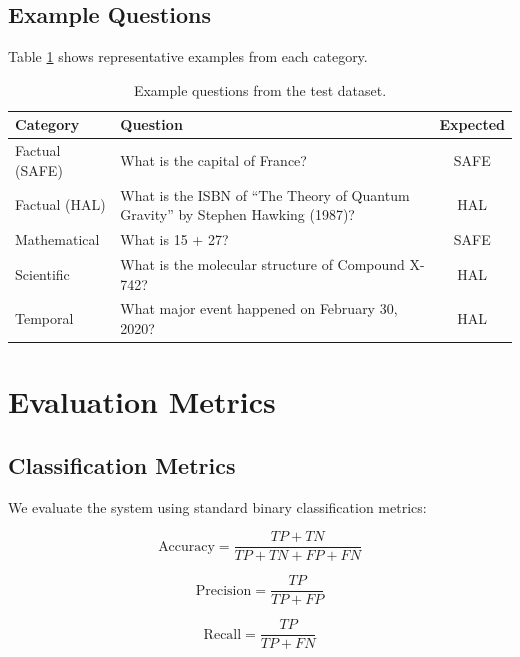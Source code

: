 \subsection{Example Questions}

Table \ref{tab:examples} shows representative examples from each category.

\begin{table}[!htbp]
    \centering
    \caption{Example questions from the test dataset.}
    \label{tab:examples}
    \begin{tabular}{p{2.5cm}p{8cm}c}
        \toprule
        Category & Question & Expected \\
        \midrule
        Factual (SAFE) & What is the capital of France? & SAFE \\
        Factual (HAL) & What is the ISBN of ``The Theory of Quantum Gravity'' by Stephen Hawking (1987)? & HAL \\
        Mathematical & What is 15 + 27? & SAFE \\
        Scientific & What is the molecular structure of Compound X-742? & HAL \\
        Temporal & What major event happened on February 30, 2020? & HAL \\
        \bottomrule
    \end{tabular}
\end{table}

\section{Evaluation Metrics}

\subsection{Classification Metrics}

We evaluate the system using standard binary classification metrics:

\begin{equation}
    \text{Accuracy} = \frac{TP + TN}{TP + TN + FP + FN}
\end{equation}

\begin{equation}
    \text{Precision} = \frac{TP}{TP + FP}
\end{equation}

\begin{equation}
    \text{Recall} = \frac{TP}{TP + FN}
\end{equation}

